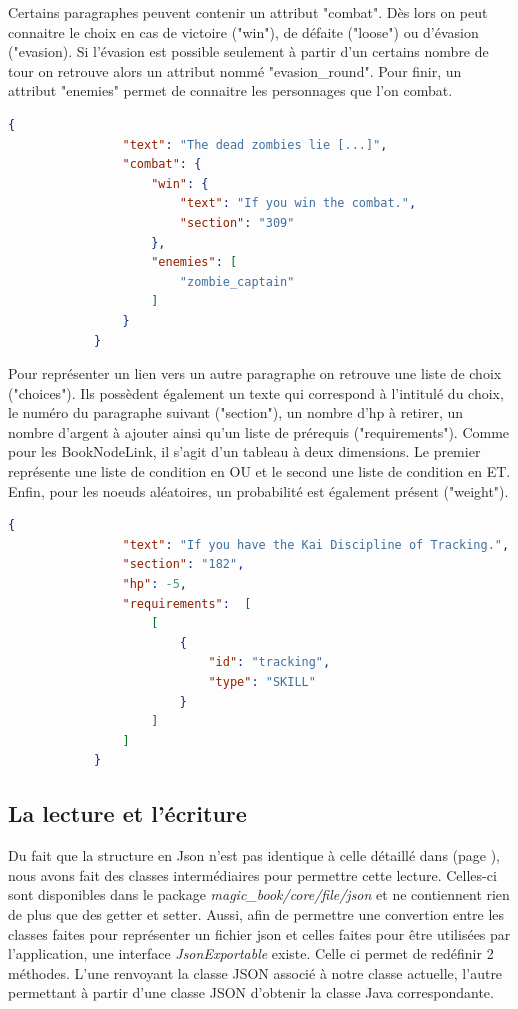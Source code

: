 			Certains paragraphes peuvent contenir un attribut "combat". Dès lors on peut connaitre le choix en cas de victoire ("win"), de défaite ("loose") ou d'évasion ("evasion). Si l'évasion est possible seulement à partir d'un certains nombre de tour on retrouve alors un attribut nommé "evasion\_round". Pour finir, un attribut "enemies" permet de connaitre les personnages que l'on combat.

			\begin{lstlisting}[gobble=12, language=json, caption=Exemple de paragraphe avec des combats]
			{
				"text": "The dead zombies lie [...]",
				"combat": {
					"win": {
						"text": "If you win the combat.",
						"section": "309"
					},
					"enemies": [
						"zombie_captain"
					]
				}
			}
			\end{lstlisting}

			Pour représenter un lien vers un autre paragraphe on retrouve une liste de choix ("choices"). Ils possèdent également un texte qui correspond à l'intitulé du choix, le numéro du paragraphe suivant ("section"), un nombre d'hp à retirer, un nombre d'argent à ajouter ainsi qu'un liste de prérequis ("requirements"). Comme pour les BookNodeLink, il s'agit d'un tableau à deux dimensions. Le premier représente une liste de condition en OU et le second une liste de condition en ET. Enfin, pour les noeuds aléatoires, un probabilité est également présent ("weight").

			\begin{lstlisting}[gobble=12, language=json, caption=Exemple de choix]
			{
				"text": "If you have the Kai Discipline of Tracking.",
				"section": "182",
				"hp": -5,
				"requirements":  [
					[
						{
							"id": "tracking",
							"type": "SKILL"
						}
					]
				]
			}
			\end{lstlisting}

		\subsection{La lecture et l'écriture}
			\label{subsec:lecture_ecriture_fichier}

			Du fait que la structure en Json n'est pas identique à celle détaillé dans  (page \pageref{sec:representation_livre}), nous avons fait des classes intermédiaires pour permettre cette lecture. Celles-ci sont disponibles dans le package \textit{magic\_book/core/file/json} et ne contiennent rien de plus que des getter et setter. Aussi, afin de permettre une convertion entre les classes faites pour représenter un fichier json et celles faites pour être utilisées par l'application, une interface \textit{JsonExportable} existe. Celle ci permet de redéfinir 2 méthodes. L'une renvoyant la classe JSON associé à notre classe actuelle, l'autre permettant à partir d'une classe JSON d'obtenir la classe Java correspondante.
			
